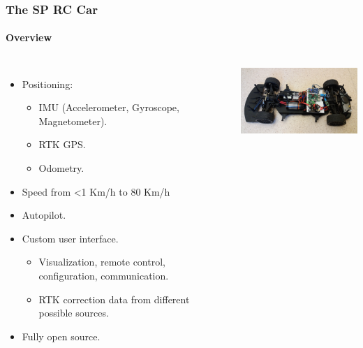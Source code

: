 \documentclass[aspectratio=169,electronics,notopline]{beamer}
\begin{document}
\begin{frame} 
\frametitle{The SP RC Car}
\framesubtitle{Overview}
\begin{columns}[c]
\begin{itemize}
\item Positioning:
	\begin{itemize}
	\item IMU (Accelerometer, Gyroscope,  Magnetometer).
	\item RTK GPS.
	\item Odometry.
	\end{itemize}
\item Speed from <1 Km/h to 80 Km/h
\item Autopilot.
\item Custom user interface.
\begin{itemize}
\item Visualization, remote control, configuration, communication.
\item RTK correction data from different possible sources.
\end{itemize}
\item Fully open source.
\end{itemize}
\begin{center}
	\includegraphics[width=6cm]{Figures/car.jpg}
\end{center}
\end{columns}
\end{frame}
\end{document}
